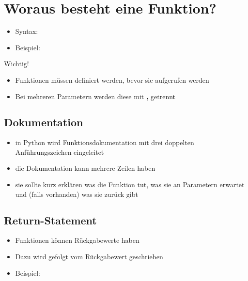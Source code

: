 \section{Woraus besteht eine Funktion?}
\begin{frame}
	\slidehead

	\begin{itemize}
		\item Syntax: 
		\pause

		\item Beispiel:
	\end{itemize}
	\begin{block}{Wichtig!}
		\begin{itemize}
			\item Funktionen müssen definiert werden, bevor sie aufgerufen werden
			\item Bei mehreren Parametern werden diese mit \textbf{,} getrennt
		\end{itemize}
	\end{block}
\end{frame}

\subsection{Dokumentation}
\begin{frame}
	\slidehead
	\begin{itemize}
		\item in Python wird Funktionsdokumentation mit drei doppelten Anführungszeichen eingeleitet
		\item die Dokumentation kann mehrere Zeilen haben
		\item sie sollte kurz erklären was die Funktion tut, was sie an Parametern erwartet und (falls vorhanden) was sie zurück gibt
	\end{itemize}
\end{frame}

\subsection{Return-Statement}
\begin{frame}
	\slidehead
	\begin{itemize}
		\item Funktionen können Rückgabewerte haben
		\item Dazu wird  gefolgt vom Rückgabewert geschrieben
		\item Beispiel: 
	\end{itemize}
\end{frame}

